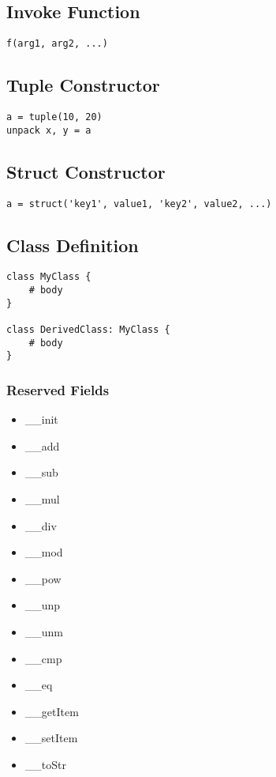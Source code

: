 \documentclass[]{article}
\begin{document}
\subsection{Invoke Function}
\begin{lstlisting}
f(arg1, arg2, ...)
\end{lstlisting}

\subsection{Tuple Constructor}
\begin{lstlisting}
a = tuple(10, 20)
unpack x, y = a
\end{lstlisting}

\subsection{Struct Constructor}
\begin{lstlisting}
a = struct('key1', value1, 'key2', value2, ...)
\end{lstlisting}

\subsection{Class Definition}
\begin{lstlisting}
class MyClass {
	# body
}

class DerivedClass: MyClass {
	# body
}
\end{lstlisting}

\subsubsection{Reserved Fields}
\begin{itemize}
	\item \_\_init
	\item \_\_add
	\item \_\_sub
	\item \_\_mul
	\item \_\_div
	\item \_\_mod
	\item \_\_pow
	\item \_\_unp
	\item \_\_unm
	\item \_\_cmp
	\item \_\_eq
	\item \_\_getItem
	\item \_\_setItem
	\item \_\_toStr
\end{itemize}
\end{document}
